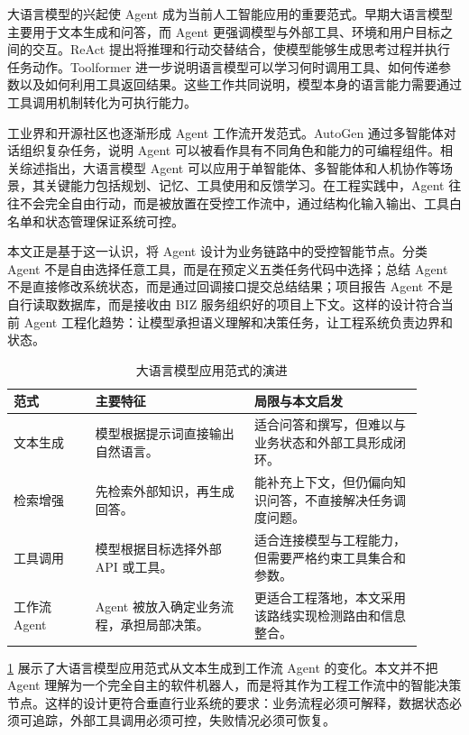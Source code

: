 大语言模型的兴起使 Agent 成为当前人工智能应用的重要范式。早期大语言模型主要用于文本生成和问答，而 Agent 更强调模型与外部工具、环境和用户目标之间的交互。ReAct 提出将推理和行动交替结合，使模型能够生成思考过程并执行任务动作\cite{yao2023react}。Toolformer 进一步说明语言模型可以学习何时调用工具、如何传递参数以及如何利用工具返回结果\cite{schick2023toolformer}。这些工作共同说明，模型本身的语言能力需要通过工具调用机制转化为可执行能力。

工业界和开源社区也逐渐形成 Agent 工作流开发范式。AutoGen 通过多智能体对话组织复杂任务，说明 Agent 可以被看作具有不同角色和能力的可编程组件\cite{wu2023autogen}。相关综述指出，大语言模型 Agent 可以应用于单智能体、多智能体和人机协作等场景，其关键能力包括规划、记忆、工具使用和反馈学习\cite{wang2023llmagents}。在工程实践中，Agent 往往不会完全自由行动，而是被放置在受控工作流中，通过结构化输入输出、工具白名单和状态管理保证系统可控。

本文正是基于这一认识，将 Agent 设计为业务链路中的受控智能节点。分类 Agent 不是自由选择任意工具，而是在预定义五类任务代码中选择；总结 Agent 不是直接修改系统状态，而是通过回调接口提交总结结果；项目报告 Agent 不是自行读取数据库，而是接收由 BIZ 服务组织好的项目上下文。这样的设计符合当前 Agent 工程化趋势：让模型承担语义理解和决策任务，让工程系统负责边界和状态。

\begin{table}[!htb]
  \caption{大语言模型应用范式的演进}\label{tab:llm-agent-evolution}
  \centering
  \begin{tabular}{@{}p{0.18\linewidth}p{0.35\linewidth}p{0.37\linewidth}@{}} \toprule
    \textbf{范式} & \textbf{主要特征} & \textbf{局限与本文启发} \\ \midrule
    文本生成 & 模型根据提示词直接输出自然语言。 & 适合问答和撰写，但难以与业务状态和外部工具形成闭环。 \\
    检索增强 & 先检索外部知识，再生成回答。 & 能补充上下文，但仍偏向知识问答，不直接解决任务调度问题。 \\
    工具调用 & 模型根据目标选择外部 API 或工具。 & 适合连接模型与工程能力，但需要严格约束工具集合和参数。 \\
    工作流 Agent & Agent 被放入确定业务流程，承担局部决策。 & 更适合工程落地，本文采用该路线实现检测路由和信息整合。 \\ \bottomrule
  \end{tabular}
\end{table}

\cref{tab:llm-agent-evolution} 展示了大语言模型应用范式从文本生成到工作流 Agent 的变化。本文并不把 Agent 理解为一个完全自主的软件机器人，而是将其作为工程工作流中的智能决策节点。这样的设计更符合垂直行业系统的要求：业务流程必须可解释，数据状态必须可追踪，外部工具调用必须可控，失败情况必须可恢复。

